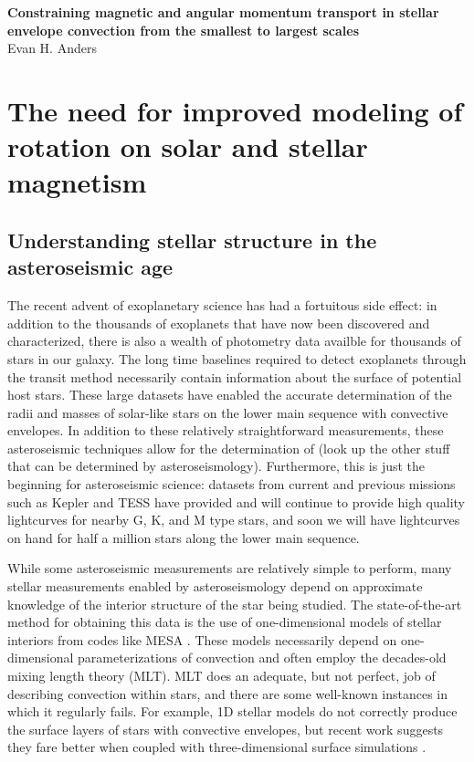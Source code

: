 \documentclass[aasms,12pt]{article}
\begin{document}
\begin{center}
   \large\textbf{Constraining magnetic and angular momentum transport in stellar envelope convection from the smallest to largest scales}\\
   \vspace{0.2cm}
   \large{Evan H. Anders}\\
   \vspace{0.2cm}
\end{center}

\vspace{-0.6cm}

\section{The need for improved modeling of rotation on solar and stellar magnetism}

\subsection{Understanding stellar structure in the asteroseismic age}
The recent advent of exoplanetary science has had a fortuitous side effect: in addition to the thousands of exoplanets that have now been discovered and characterized, there is also a wealth of photometry data availble for thousands of stars in our galaxy.
The long time baselines required to detect exoplanets through the transit method necessarily contain information about the surface of potential host stars.
These large datasets have enabled the accurate determination of the radii and masses of solar-like stars on the lower main sequence with convective envelopes.
In addition to these relatively straightforward measurements, these asteroseismic techniques allow for the determination of (look up the other stuff that can be determined by asteroseismology).
Furthermore, this is just the beginning for asteroseismic science: datasets from current and previous missions such as Kepler and TESS have provided and will continue to provide high quality lightcurves for nearby G, K, and M type stars, and soon we will have lightcurves on hand for half a million stars along the lower main sequence.

While some asteroseismic measurements are relatively simple to perform, many stellar measurements enabled by asteroseismology depend on approximate knowledge of the interior structure of the star being studied.
The state-of-the-art method for obtaining this data is the use of one-dimensional models of stellar interiors from codes like MESA \citep{paxton&all2011}.
These models necessarily depend on one-dimensional parameterizations of convection and often employ the decades-old mixing length theory (MLT).
MLT does an adequate, but not perfect, job of describing convection within stars, and there are some well-known instances in which it regularly fails.
For example, 1D stellar models do not correctly produce the surface layers of stars with convective envelopes, but recent work suggests they fare better when coupled with three-dimensional surface simulations \citep{jorgensen&weiss2019}.
\end{document}
